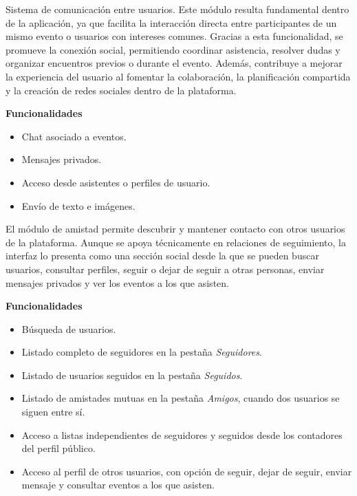 \begin{tcolorbox}[title=\textbf{Mensajería}]
Sistema de comunicación entre usuarios. Este módulo resulta fundamental dentro de la aplicación, ya que facilita la interacción directa entre participantes de un mismo evento o usuarios con intereses comunes. Gracias a esta funcionalidad, se promueve la conexión social, permitiendo coordinar asistencia, resolver dudas y organizar encuentros previos o durante el evento. Además, contribuye a mejorar la experiencia del usuario al fomentar la colaboración, la planificación compartida y la creación de redes sociales dentro de la plataforma.

\vspace{0.4em}
\textbf{Funcionalidades}
\begin{itemize}[leftmargin=1.5em]
\item Chat asociado a eventos.
\item Mensajes privados.
\item Acceso desde asistentes o perfiles de usuario.
\item Envío de texto e imágenes.
\end{itemize}
\end{tcolorbox}

\begin{tcolorbox}[title=\textbf{Amistad}]
El módulo de amistad permite descubrir y mantener contacto con otros usuarios de la plataforma. Aunque se apoya técnicamente en relaciones de seguimiento, la interfaz lo presenta como una sección social desde la que se pueden buscar usuarios, consultar perfiles, seguir o dejar de seguir a otras personas, enviar mensajes privados y ver los eventos a los que asisten.

\vspace{0.4em}
\textbf{Funcionalidades}
\begin{itemize}[leftmargin=1.5em]
\item Búsqueda de usuarios.
\item Listado completo de seguidores en la pestaña \textit{Seguidores}.
\item Listado de usuarios seguidos en la pestaña \textit{Seguidos}.
\item Listado de amistades mutuas en la pestaña \textit{Amigos}, cuando dos usuarios se siguen entre sí.
\item Acceso a listas independientes de seguidores y seguidos desde los contadores del perfil público.
\item Acceso al perfil de otros usuarios, con opción de seguir, dejar de seguir, enviar mensaje y consultar eventos a los que asisten.
\end{itemize}
\end{tcolorbox}

